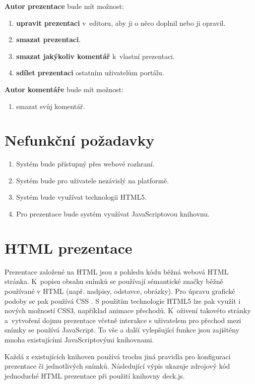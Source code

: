 \documentclass[11pt,twoside,a4paper]{book}
\newcommand*{\nom}[2]{#1 \nomenclature{#1}{#2}} 			%
\begin{document}
\noindent \textbf{Autor prezentace} bude mít možnost:
\begin{enumerate}
	\item \textbf{upravit prezentaci} v~editoru, aby ji o něco doplnil nebo ji opravil.
	\item \textbf{smazat prezentaci}.
	\item \textbf{smazat jakýkoliv komentář} k~vlastní prezentaci.
	\item \textbf{sdílet prezentaci} ostatním uživatelům portálu.
\end{enumerate}


\noindent \textbf{Autor komentáře} bude mít možnost:
\begin{enumerate}
	\item smazat svůj komentář.
\end{enumerate}


\section{Nefunkční požadavky}
\begin{enumerate}
	\item Systém bude přístupný přes webové rozhraní.
	\item Systém bude pro uživatele nezávislý na platformě.
	\item Systém bude využívat technologii HTML5.
	\item Pro prezentace bude systém využívat JavaScriptovou knihovnu.
\end{enumerate}



\section{HTML prezentace}
Prezentace založené na HTML jsou z pohledu kódu běžná webová HTML stránka. K~popisu obsahu snímků se používají sémantické značky běžně používané v HTML (např. nadpisy, odstavce, obrázky). Pro úpravu grafické podoby se pak používá \nom{CSS}{Cascading Style Sheets}. S použitím technologie HTML5 lze pak využít i nových možností CSS3, například animace přechodů. K~oživení takovéto stránky a~vytvoření dojmu prezentace včetně interakce s uživatelem pro přechod mezi snímky se používá JavaScript. To vše a další vylepšující funkce jsou zajištěny mnoha existujícími JavaScriptovými knihovnami.

Každá z existujících knihoven používá trochu jiná pravidla pro konfiguraci prezentace či jednotlivých snímků. Následující výpis ukazuje zdrojový kód jednoduché HTML prezentace při použití knihovny deck.js.
\end{document}
